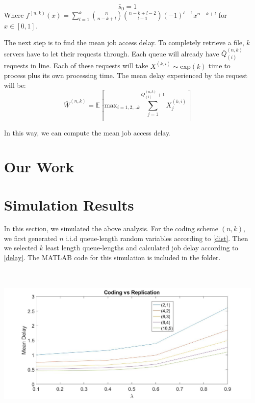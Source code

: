 \documentclass{article}
\begin{document}
\begin{equation}
\bar{s}_{0}=1
\end{equation}
Where $ f^{(n,k)}(x) = \sum_{l=1}^{k} {{n}\choose{n-k+l}}{{n-k+l-2}\choose{l-1}}(-1)^{l-1}x^{n-k+l} $ for $ x\in [0,1] $.
\medskip

The next step is to find the mean job access delay. To completely retrieve a file, $ k $ servers have to let their requests through. Each queue will already have $ \bar{Q}^{(n,k)}_{(i)} $ requests in line. Each of these requests will take $ X^{(k,i)}\sim\text{exp}(k)$ time to process plus its own processing time. The mean delay experienced by the request will be:
\begin{equation} \label{delay}
\bar{W}^{(n,k)} = \mathbb{E}\left[ \text{max}_{i=1,2,..k} \sum_{j=1}^{\bar{Q}^{(n,k)}_{(i)}+1}X_j^{(k,i)} \right]
\end{equation}

In this way, we can compute the mean job access delay.

\section*{\huge Our Work}

\section{Simulation Results}
In this section, we simulated the above analysis. For the coding scheme $(n,k)$, we first generated $n$ i.i.d queue-length random variables according to \eqref{dist}. Then we selected $k$ least length queue-lengths and calculated job delay according to \eqref{delay}. The MATLAB code for this simulation is included in the folder.

\includegraphics[width = 15cm, height = 8cm]{result1.jpg}
\end{document}
